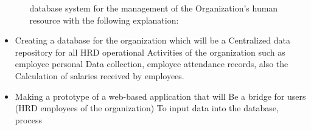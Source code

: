 \documentclass{article}
\begin{document}
\begin{itemize}
\begin{itemize}
database system for the management of the Organization’s human
resource with the following explanation:
\end{itemize}
\item Creating a database for the organization which will be a Centralized data repository for all HRD operational Activities of the
organization such as employee personal Data collection, employee
attendance records, also the Calculation of salaries received by
employees.
\item Making a prototype of a web-based application that will Be a bridge
for users (HRD employees of the organization) To input data into the
database, process
\end{itemize}
\end{document}
